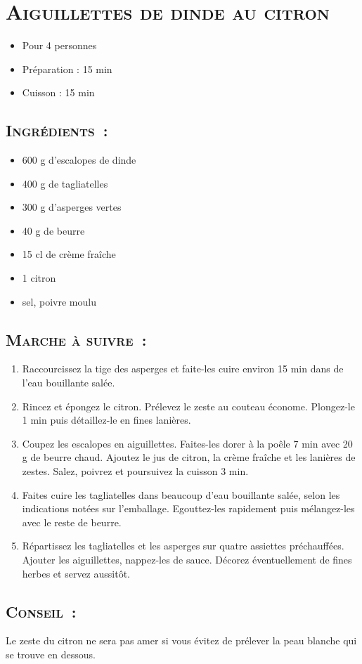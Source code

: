 % 
\section[\normalsize{Aiguillettes de dinde au citron}]{\LARGE{\textsc{Aiguillettes de dinde au citron}}}


\begin{itemize}
\item Pour 4 personnes
\item Préparation : 15 min
\item Cuisson : 15 min
\end{itemize}
\subsection*{\textsc{Ingr\'edients~:}}

\begin{itemize}
\item 600 g d’escalopes de dinde 
\item 400 g de tagliatelles
\item 300 g d’asperges vertes 
\item 40 g de beurre
\item 15 cl de cr\`eme fra\^iche
\item 1 citron
\item sel, poivre moulu
\end{itemize}


\subsection*{\textsc{Marche \`a suivre~:}}

\begin{enumerate}

\item Raccourcissez la tige des asperges et faite-les cuire environ 15 min dans de l’eau bouillante sal\'ee.

\item Rincez et \'epongez le citron. Pr\'elevez le zeste au couteau \'econome. Plongez-le 1 min puis d\'etaillez-le en fines lani\`eres.

\item Coupez les escalopes en aiguillettes. Faites-les dorer \`a la poêle 7 min avec 20 g de beurre chaud. Ajoutez le jus de citron, la cr\`eme fra\^iche et les lani\`eres de zestes. Salez, poivrez et poursuivez la cuisson 3 min.

\item Faites cuire les tagliatelles dans beaucoup d’eau bouillante sal\'ee, selon les indications not\'ees sur l’emballage. Egouttez-les rapidement puis m\'elangez-les avec le reste de beurre.

\item R\'epartissez les tagliatelles et les asperges sur quatre assiettes pr\'echauff\'ees. Ajouter les aiguillettes, nappez-les de sauce. D\'ecorez \'eventuellement de fines herbes et servez aussitôt.
\end{enumerate}


\subsection*{\textsc{Conseil~:}}
Le zeste du citron ne sera pas amer si vous \'evitez de pr\'elever la peau blanche qui se trouve en dessous.
